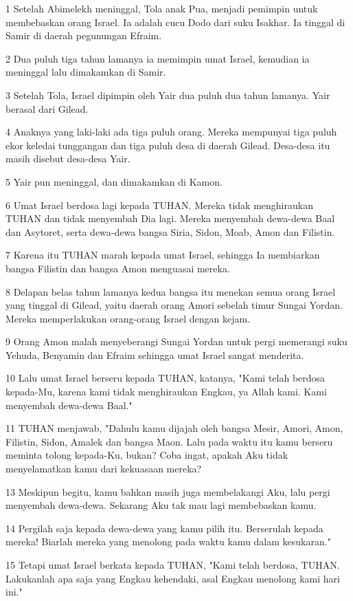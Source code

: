 \par 1 Setelah Abimelekh meninggal, Tola anak Pua, menjadi pemimpin untuk membebaskan orang Israel. Ia adalah cucu Dodo dari suku Isakhar. Ia tinggal di Samir di daerah pegunungan Efraim.
\par 2 Dua puluh tiga tahun lamanya ia memimpin umat Israel, kemudian ia meninggal lalu dimakamkan di Samir.
\par 3 Setelah Tola, Israel dipimpin oleh Yair dua puluh dua tahun lamanya. Yair berasal dari Gilead.
\par 4 Anaknya yang laki-laki ada tiga puluh orang. Mereka mempunyai tiga puluh ekor keledai tunggangan dan tiga puluh desa di daerah Gilead. Desa-desa itu masih disebut desa-desa Yair.
\par 5 Yair pun meninggal, dan dimakamkan di Kamon.
\par 6 Umat Israel berdosa lagi kepada TUHAN. Mereka tidak menghiraukan TUHAN dan tidak menyembah Dia lagi. Mereka menyembah dewa-dewa Baal dan Asytoret, serta dewa-dewa bangsa Siria, Sidon, Moab, Amon dan Filistin.
\par 7 Karena itu TUHAN marah kepada umat Israel, sehingga Ia membiarkan bangsa Filistin dan bangsa Amon menguasai mereka.
\par 8 Delapan belas tahun lamanya kedua bangsa itu menekan semua orang Israel yang tinggal di Gilead, yaitu daerah orang Amori sebelah timur Sungai Yordan. Mereka memperlakukan orang-orang Israel dengan kejam.
\par 9 Orang Amon malah menyeberangi Sungai Yordan untuk pergi memerangi suku Yehuda, Benyamin dan Efraim sehingga umat Israel sangat menderita.
\par 10 Lalu umat Israel berseru kepada TUHAN, katanya, "Kami telah berdosa kepada-Mu, karena kami tidak menghiraukan Engkau, ya Allah kami. Kami menyembah dewa-dewa Baal."
\par 11 TUHAN menjawab, "Dahulu kamu dijajah oleh bangsa Mesir, Amori, Amon, Filistin, Sidon, Amalek dan bangsa Maon. Lalu pada waktu itu kamu berseru meminta tolong kepada-Ku, bukan? Coba ingat, apakah Aku tidak menyelamatkan kamu dari kekuasaan mereka?
\par 13 Meskipun begitu, kamu bahkan masih juga membelakangi Aku, lalu pergi menyembah dewa-dewa. Sekarang Aku tak mau lagi membebaskan kamu.
\par 14 Pergilah saja kepada dewa-dewa yang kamu pilih itu. Berserulah kepada mereka! Biarlah mereka yang menolong pada waktu kamu dalam kesukaran."
\par 15 Tetapi umat Israel berkata kepada TUHAN, "Kami telah berdosa, TUHAN. Lakukanlah apa saja yang Engkau kehendaki, asal Engkau menolong kami hari ini."
